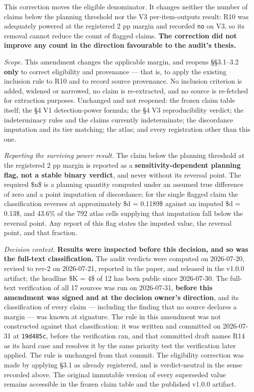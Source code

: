 This correction moves the eligible denominator. It changes neither the number of claims below the planning threshold nor the V3 per-item-outputs result: R10 was adequately powered at the registered 2 pp margin and recorded \texttt{no} on V3, so its removal cannot reduce the count of flagged claims. \textbf{The correction did not improve any count in the direction favourable to the audit's thesis.}

\emph{Scope.} This amendment changes the applicable margin, and reopens \S{}\S{}3.1--3.2 \textbf{only} to correct eligibility and provenance --- that is, to apply the existing inclusion rule to R10 and to record source provenance. No inclusion criterion is added, widened or narrowed, no claim is re-extracted, and no source is re-fetched for extraction purposes. Unchanged and not reopened: the frozen claim table itself; the \S{}4 V1 detection-power formula; the \S{}4 V3 reproducibility verdict; the indeterminacy rules and the claims currently indeterminate; the discordance imputation and its tier matching; the atlas; and every registration other than this one.

\emph{Reporting the surviving power result.} The claim below the planning threshold at the registered 2 pp margin is reported as a \textbf{sensitivity-dependent planning flag, not a stable binary verdict}, and never without its reversal point. The required \$n\$ is a planning quantity computed under an assumed true difference of zero and a point imputation of discordance; for the single flagged claim the classification reverses at approximately \$d = 0.1189\$ against an imputed \$d = 0.13\$, and 43.6\% of the 792 atlas cells supplying that imputation fall below the reversal point. Any report of this flag states the imputed value, the reversal point, and that fraction.

\emph{Decision context.} \textbf{Results were inspected before this decision, and so was the full-text classification.} The audit verdicts were computed on 2026-07-20, revised to rev-2 on 2026-07-21, reported in the paper, and released in the v1.0.0 artifact; the headline \$K = 4\$ of 12 has been public since 2026-07-30. The full-text verification of all 17 sources was run on 2026-07-31, \textbf{before this amendment was signed and at the decision owner's direction}, and its classification of every claim --- including the finding that no source declares a margin --- was known at signature. The rule in this amendment was not constructed against that classification: it was written and committed on 2026-07-31 at \texttt{19d485c}, before the verification ran, and that committed draft names R14 as its hard case and resolves it by the same priority test the verification later applied. The rule is unchanged from that commit. The eligibility correction was made by applying \S{}3.1 as already registered, and is verdict-neutral in the sense recorded above. The original immutable version of every superseded value remains accessible in the frozen claim table and the published v1.0.0 artifact.


